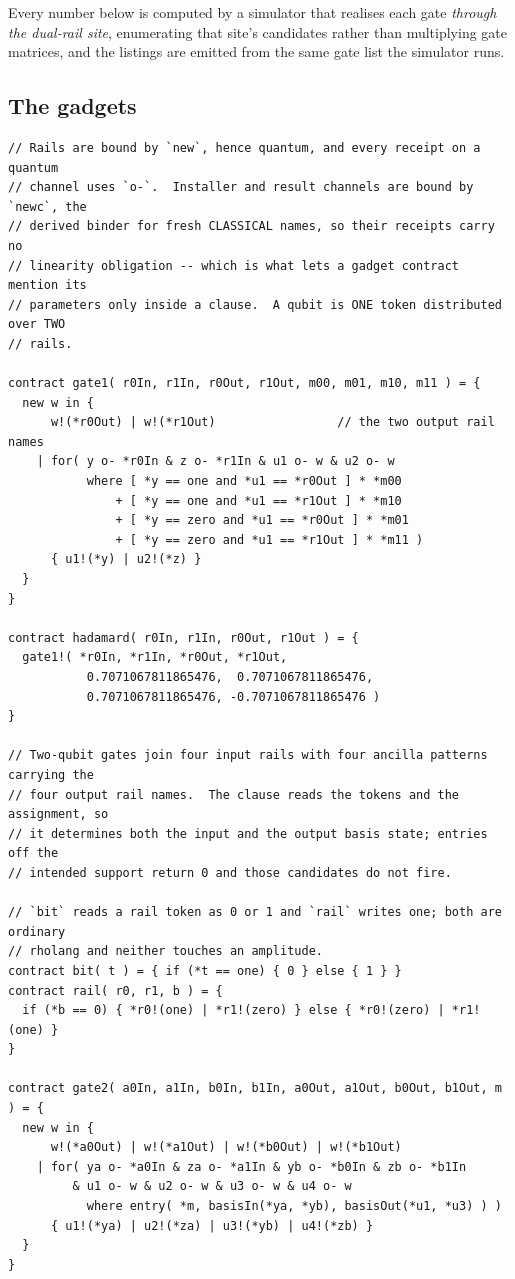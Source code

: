 \documentclass[11pt,a4paper]{article}
\theoremstyle{plain}
\theoremstyle{definition}
\theoremstyle{remark}
\begin{document}
Every number below is computed by a simulator that realises each gate
\emph{through the dual-rail site}, enumerating that site's candidates rather
than multiplying gate matrices, and the listings are emitted from the same gate
list the simulator runs.

\subsection{The gadgets}

\begin{lstlisting}
// Rails are bound by `new`, hence quantum, and every receipt on a quantum
// channel uses `o-`.  Installer and result channels are bound by `newc`, the
// derived binder for fresh CLASSICAL names, so their receipts carry no
// linearity obligation -- which is what lets a gadget contract mention its
// parameters only inside a clause.  A qubit is ONE token distributed over TWO
// rails.

contract gate1( r0In, r1In, r0Out, r1Out, m00, m01, m10, m11 ) = {
  new w in {
      w!(*r0Out) | w!(*r1Out)                 // the two output rail names
    | for( y o- *r0In & z o- *r1In & u1 o- w & u2 o- w
           where [ *y == one and *u1 == *r0Out ] * *m00
               + [ *y == one and *u1 == *r1Out ] * *m10
               + [ *y == zero and *u1 == *r0Out ] * *m01
               + [ *y == zero and *u1 == *r1Out ] * *m11 )
      { u1!(*y) | u2!(*z) }
  }
}

contract hadamard( r0In, r1In, r0Out, r1Out ) = {
  gate1!( *r0In, *r1In, *r0Out, *r1Out,
           0.7071067811865476,  0.7071067811865476,
           0.7071067811865476, -0.7071067811865476 )
}

// Two-qubit gates join four input rails with four ancilla patterns carrying the
// four output rail names.  The clause reads the tokens and the assignment, so
// it determines both the input and the output basis state; entries off the
// intended support return 0 and those candidates do not fire.

// `bit` reads a rail token as 0 or 1 and `rail` writes one; both are ordinary
// rholang and neither touches an amplitude.
contract bit( t ) = { if (*t == one) { 0 } else { 1 } }
contract rail( r0, r1, b ) = {
  if (*b == 0) { *r0!(one) | *r1!(zero) } else { *r0!(zero) | *r1!(one) }
}

contract gate2( a0In, a1In, b0In, b1In, a0Out, a1Out, b0Out, b1Out, m ) = {
  new w in {
      w!(*a0Out) | w!(*a1Out) | w!(*b0Out) | w!(*b1Out)
    | for( ya o- *a0In & za o- *a1In & yb o- *b0In & zb o- *b1In
         & u1 o- w & u2 o- w & u3 o- w & u4 o- w
           where entry( *m, basisIn(*ya, *yb), basisOut(*u1, *u3) ) )
      { u1!(*ya) | u2!(*za) | u3!(*yb) | u4!(*zb) }
  }
}
\end{lstlisting}
\end{document}
